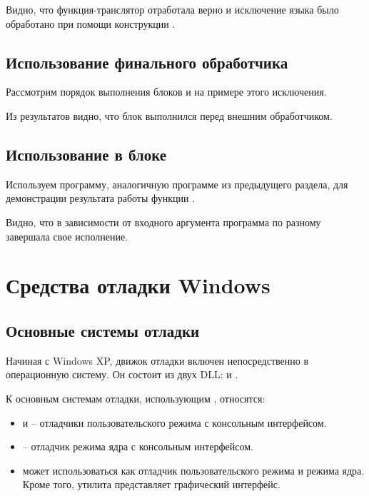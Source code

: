 Видно, что функция-транслятор отработала верно и исключение языка  было обработано при помощи конструкции .

\subsection{Использование финального обработчика }

Рассмотрим порядок выполнения блоков  и  на примере этого исключения.


Из результатов видно, что блок  выполнился перед внешним обработчиком.

\subsection{Использование  в блоке }

Используем программу, аналогичную программе из предыдущего раздела, для демонстрации результата работы функции .


Видно, что в зависимости от входного аргумента программа по разному завершала свое исполнение.

\newpage

\section{Средства отладки Windows}

\subsection{Основные системы отладки}

Начиная с Windows XP, движок отладки включен непосредственно в операционную систему. Он состоит из двух DLL:  и .

\noindent К основным системам отладки, использующим , относятся:
\begin{itemize}
	\item {} и  -- отладчики пользовательского режима с консольным интерфейсом.
	\item {} -- отладчик режима ядра с консольным интерфейсом.
	\item {} может использоваться как отладчик пользовательского режима и режима ядра. Кроме того, утилита представляет графический интерфейс.
\end{itemize}

